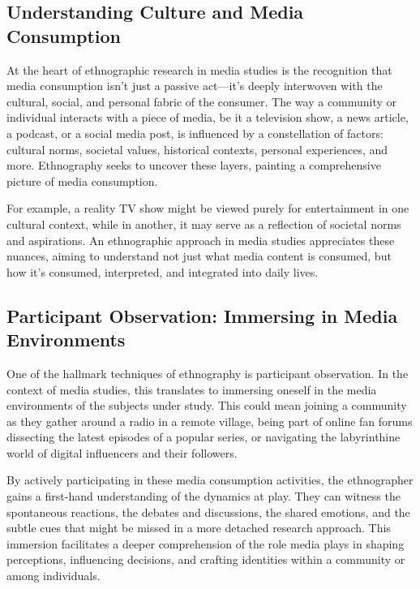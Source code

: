 \documentclass[
  b5paper]{book}
\begin{document}
\hypertarget{understanding-culture-and-media-consumption}{%
\subsection*{Understanding Culture and Media Consumption}\label{understanding-culture-and-media-consumption}}

At the heart of ethnographic research in media studies is the recognition that media consumption isn't just a passive act---it's deeply interwoven with the cultural, social, and personal fabric of the consumer. The way a community or individual interacts with a piece of media, be it a television show, a news article, a podcast, or a social media post, is influenced by a constellation of factors: cultural norms, societal values, historical contexts, personal experiences, and more. Ethnography seeks to uncover these layers, painting a comprehensive picture of media consumption.

For example, a reality TV show might be viewed purely for entertainment in one cultural context, while in another, it may serve as a reflection of societal norms and aspirations. An ethnographic approach in media studies appreciates these nuances, aiming to understand not just what media content is consumed, but how it's consumed, interpreted, and integrated into daily lives.

\hypertarget{participant-observation-immersing-in-media-environments}{%
\subsection*{Participant Observation: Immersing in Media Environments}\label{participant-observation-immersing-in-media-environments}}

One of the hallmark techniques of ethnography is participant observation. In the context of media studies, this translates to immersing oneself in the media environments of the subjects under study. This could mean joining a community as they gather around a radio in a remote village, being part of online fan forums dissecting the latest episodes of a popular series, or navigating the labyrinthine world of digital influencers and their followers.

By actively participating in these media consumption activities, the ethnographer gains a first-hand understanding of the dynamics at play. They can witness the spontaneous reactions, the debates and discussions, the shared emotions, and the subtle cues that might be missed in a more detached research approach. This immersion facilitates a deeper comprehension of the role media plays in shaping perceptions, influencing decisions, and crafting identities within a community or among individuals.
\end{document}
